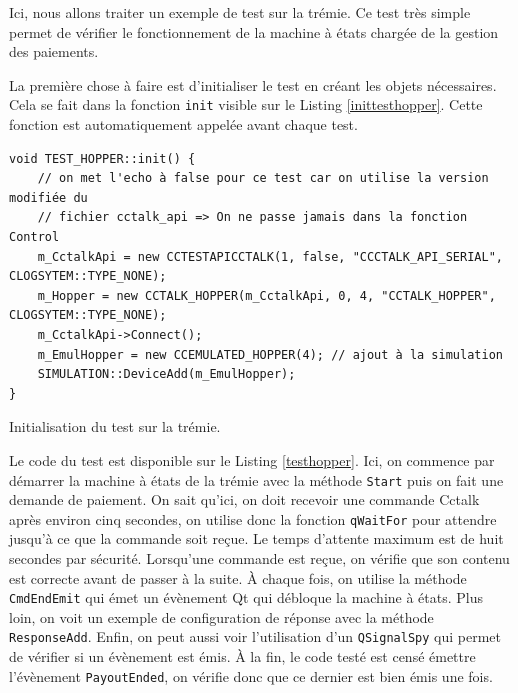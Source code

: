 \documentclass[a4paper]{article}
\begin{document}
Ici, nous allons traiter un exemple de test sur la trémie. Ce test très
simple permet de vérifier le fonctionnement de la machine à états chargée de la
gestion des paiements.

La première chose à faire est d'initialiser le test en créant les objets
nécessaires. Cela se fait dans la fonction \verb|init| visible sur le Listing
\ref{inittesthopper}. Cette fonction est automatiquement appelée avant chaque
test.

\begin{listing}[ht!]
\begin{verbatim}
void TEST_HOPPER::init() {
    // on met l'echo à false pour ce test car on utilise la version modifiée du
    // fichier cctalk_api => On ne passe jamais dans la fonction Control
    m_CctalkApi = new CCTESTAPICCTALK(1, false, "CCCTALK_API_SERIAL", CLOGSYTEM::TYPE_NONE);
    m_Hopper = new CCTALK_HOPPER(m_CctalkApi, 0, 4, "CCTALK_HOPPER", CLOGSYTEM::TYPE_NONE);
    m_CctalkApi->Connect();
    m_EmulHopper = new CCEMULATED_HOPPER(4); // ajout à la simulation
    SIMULATION::DeviceAdd(m_EmulHopper);
}
\end{verbatim}
\caption{Initialisation du test sur la trémie.}
\label{inittesthopper}
\end{listing}

Le code du test est disponible sur le Listing \ref{testhopper}. Ici, on commence
par démarrer la machine à états de la trémie avec la méthode \verb|Start| puis
on fait une demande de paiement. On sait qu'ici, on doit recevoir une commande
Cctalk après environ cinq secondes, on utilise donc la fonction \verb|qWaitFor|
pour attendre jusqu'à ce que la commande soit reçue. Le temps d'attente maximum
est de huit secondes par sécurité. Lorsqu'une commande est reçue, on vérifie que
son contenu est correcte avant de passer à la suite. À chaque fois, on utilise
la méthode \verb|CmdEndEmit| qui émet un évènement Qt qui débloque la machine à
états. Plus loin, on voit un exemple de configuration de réponse avec la méthode
\verb|ResponseAdd|. Enfin, on peut aussi voir l'utilisation d'un
\verb|QSignalSpy| qui permet de vérifier si un évènement est émis. À la fin, le
code testé est censé émettre l'évènement \verb|PayoutEnded|, on vérifie donc que
ce dernier est bien émis une fois.
\end{document}
